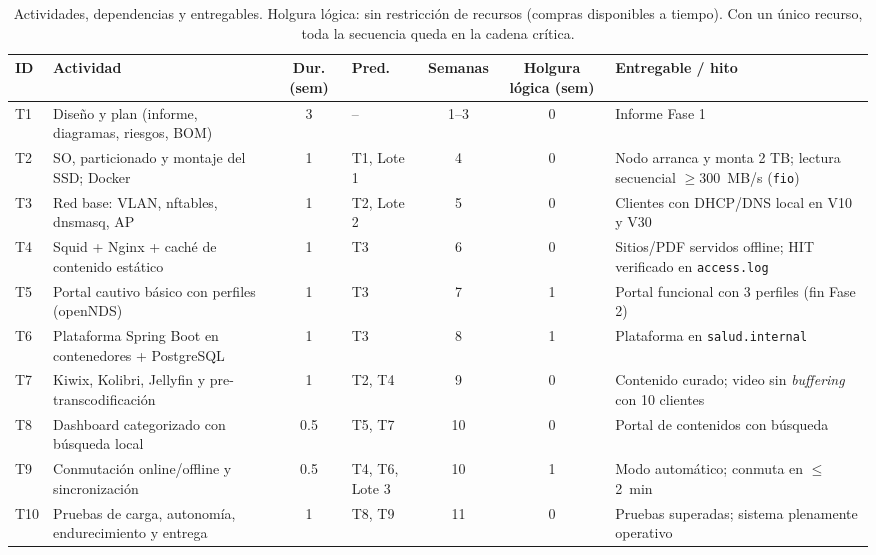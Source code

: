 \documentclass[conference]{IEEEtran}
\begin{document}
\begin{table}[t]
\caption{Actividades, dependencias y entregables. Holgura lógica: sin restricción de recursos (compras disponibles a tiempo). Con un único recurso, toda la secuencia queda en la cadena crítica.}
\label{tab:tasks}
\centering\footnotesize
\begin{tabularx}{\textwidth}{l Y c l c c Y}
\toprule
\textbf{ID} & \textbf{Actividad} & \textbf{Dur. (sem)} & \textbf{Pred.} & \textbf{Semanas} & \textbf{Holgura lógica (sem)} & \textbf{Entregable / hito} \\
\midrule
T1 & Diseño y plan (informe, diagramas, riesgos, BOM) & 3 & -- & 1--3 & 0 & Informe Fase 1 \\
T2 & SO, particionado y montaje del SSD; Docker & 1 & T1, Lote 1 & 4 & 0 & Nodo arranca y monta 2 TB; lectura secuencial $\ge$300~MB/s (\texttt{fio}) \\
T3 & Red base: VLAN, nftables, dnsmasq, AP & 1 & T2, Lote 2 & 5 & 0 & Clientes con DHCP/DNS local en V10 y V30 \\
T4 & Squid + Nginx + caché de contenido estático & 1 & T3 & 6 & 0 & Sitios/PDF servidos offline; HIT verificado en \texttt{access.log} \\
T5 & Portal cautivo básico con perfiles (openNDS) & 1 & T3 & 7 & 1 & Portal funcional con 3 perfiles (fin Fase 2) \\
T6 & Plataforma Spring Boot en contenedores + PostgreSQL & 1 & T3 & 8 & 1 & Plataforma en \texttt{salud.internal} \\
T7 & Kiwix, Kolibri, Jellyfin y pre-transcodificación & 1 & T2, T4 & 9 & 0 & Contenido curado; video sin \textit{buffering} con 10 clientes \\
T8 & Dashboard categorizado con búsqueda local & 0.5 & T5, T7 & 10 & 0 & Portal de contenidos con búsqueda \\
T9 & Conmutación online/offline y sincronización & 0.5 & T4, T6, Lote 3 & 10 & 1 & Modo automático; conmuta en $\le$2~min \\
T10 & Pruebas de carga, autonomía, endurecimiento y entrega & 1 & T8, T9 & 11 & 0 & Pruebas superadas; sistema plenamente operativo \\
\bottomrule
\end{tabularx}
\end{table}
\end{document}
